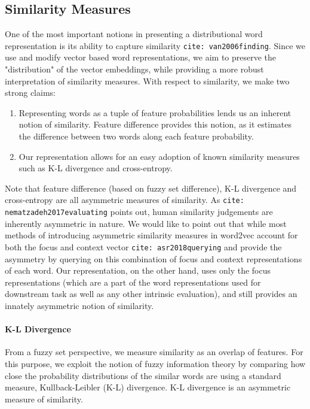 \documentclass[11pt]{book}
\newcommand{\citep}[1]{\texttt{cite: #1}}
\newcommand{\citet}[1]{\texttt{cite: #1}}
\begin{document}
\subsection{Similarity Measures} \label{ssec: similarity math} One of the most
important notions in presenting a distributional word representation is its
ability to capture similarity \citep{van2006finding}. Since we use and modify
vector based word representations, we aim to preserve the "distribution" of the
vector embeddings, while providing a more robust interpretation of similarity
measures. With respect to similarity, we make two strong claims:
\begin{enumerate} \item Representing words as a tuple of feature probabilities
lends us an inherent notion of similarity. Feature difference provides this
notion, as it estimates the difference between two words along each feature
probability.  \item Our representation allows for an easy adoption of known
similarity measures such as K-L divergence and cross-entropy.  \end{enumerate}

Note that feature difference (based on fuzzy set difference), K-L divergence
and cross-entropy are all asymmetric measures of similarity. As
\citet{nematzadeh2017evaluating} points out, human similarity judgements are
inherently asymmetric in nature. We would like to point out that while most
methods of introducing asymmetric similarity measures in word2vec account for
both the focus and context vector \citet{asr2018querying} and provide the
asymmetry by querying on this combination of focus and context representations
of each word. Our representation, on the other hand, uses only the focus
representations (which are a part of the word representations used for
downstream task as well as any other intrinsic evaluation), and still provides
an innately asymmetric notion of similarity.

\paragraph{K-L Divergence} From a fuzzy set perspective, we measure similarity
as an overlap of features. For this purpose, we exploit the notion of fuzzy
information theory by comparing how close the probability distributions of the
similar words are using a standard measure, Kullback-Leibler (K-L) divergence.
K-L divergence is an asymmetric measure of similarity. 
\end{document}
